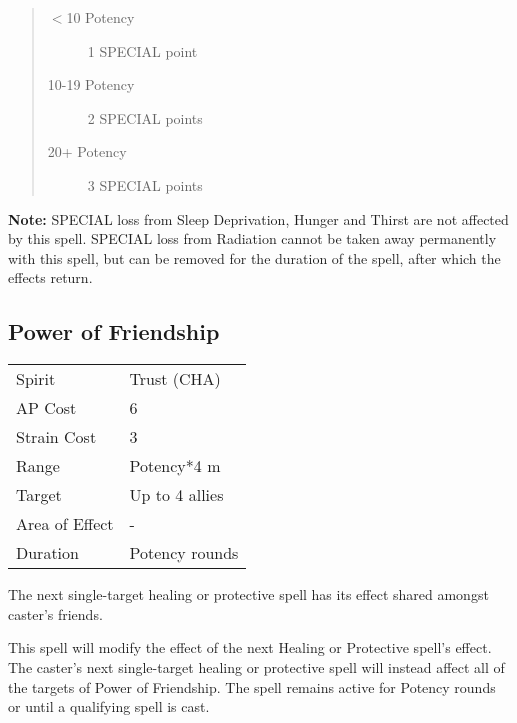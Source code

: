\documentclass[11pt,a4paper,twocolumn]{book}
\begin{document}
\begin{quote}
	\begin{description}
		\item[$<$10 Potency] 	1 SPECIAL point
		\item[10-19 Potency] 	2 SPECIAL points
		\item[20+ Potency] 		3 SPECIAL points
	\end{description}	
\end{quote}

\textbf{Note:} SPECIAL loss from Sleep Deprivation, Hunger and Thirst are not affected by this spell. SPECIAL loss from Radiation cannot be taken away permanently with this spell, but can be removed for the duration of the spell, after which the effects return.

\subsection*{Power of Friendship}
{
	\begin{tabu} to 75mm{| X[l,4] | X[l,7] |}
		\hline
		Spirit         & Trust (CHA)    \\
		AP Cost        & 6              \\
		Strain Cost    & 3              \\
		Range          & Potency*4 m    \\
		Target         & Up to 4 allies \\
		Area of Effect & -              \\
		Duration       & Potency rounds \\ \hline
	\end{tabu}
	
}

\medskip

The next single-target healing or protective spell has its effect shared amongst caster's friends.

This spell will modify the effect of the next Healing or Protective spell's effect. The caster's next single-target healing or protective spell will instead affect all of the targets of Power of Friendship. The spell remains active for Potency rounds or until a qualifying spell is cast.
\end{document}

